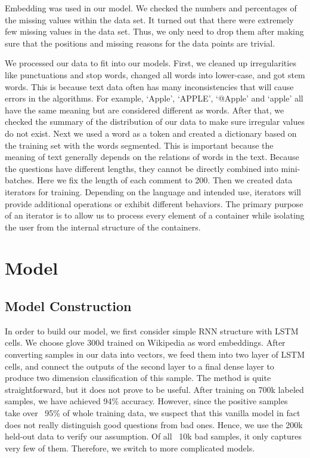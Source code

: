 \documentclass{article}
\begin{document}
Embedding was used in our model. We checked the numbers and percentages of the missing values within the data set. It turned out that there were extremely few missing values in the data set. Thus, we only need to drop them after making sure that the positions and missing reasons for the data points are trivial. 

We processed our data to fit into our models. First, we cleaned up irregularities like punctuations and stop words, changed all words into lower-case, and got stem words. This is because text data often has many inconsistencies that will cause errors in the algorithms. For example, ‘Apple’, ‘APPLE’, ‘@Apple’ and ‘apple’ all have the same meaning but are considered different as words. After that, we checked the summary of the distribution of our data to make sure irregular values do not exist. Next we used a word as a token and created a dictionary based on the training set with the words segmented. This is important because the meaning of text generally depends on the relations of words in the text. Because the questions have different lengths, they cannot be directly combined into mini-batches. Here we fix the length of each comment to 200. Then we created data iterators for training. Depending on the language and intended use, iterators will provide additional operations or exhibit different behaviors. The primary purpose of an iterator is to allow us to process every element of a container while isolating the user from the internal structure of the containers.

\section{Model}
\subsection{Model Construction}

In order to build our model, we first consider simple RNN structure with LSTM cells. We choose glove 300d trained on Wikipedia as word embeddings. After converting samples in our data into vectors, we feed them into two layer of LSTM cells, and connect the outputs of the second layer to a final dense layer to produce two dimension classification of this sample. The method is quite straightforward, but it does not prove to be useful. After training on 700k labeled samples, we have achieved 94\% accuracy. However, since the positive samples take over ~95\% of whole training data, we suspect that this vanilla model in fact does not really distinguish good questions from bad ones. Hence, we use the 200k held-out data to verify our assumption. Of all ~10k bad samples, it only captures very few of them. Therefore, we switch to more complicated models. 
\end{document}
